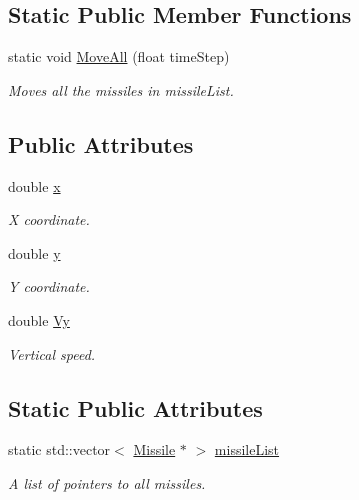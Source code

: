 \subsection*{Static Public Member Functions}
\begin{DoxyCompactItemize}
\item 
static void \hyperlink{class_missile_a7456f2bdca970cb8511c74696dd643b4}{Move\+All} (float time\+Step)
\begin{DoxyCompactList}\small\item\em Moves all the missiles in missile\+List. \end{DoxyCompactList}\end{DoxyCompactItemize}
\subsection*{Public Attributes}
\begin{DoxyCompactItemize}
\item 
\mbox{\label{class_missile_a763cf58f17fed394b8ea34e09e35dc10}} 
double \hyperlink{class_missile_a763cf58f17fed394b8ea34e09e35dc10}{x}
\begin{DoxyCompactList}\small\item\em X coordinate. \end{DoxyCompactList}\item 
\mbox{\label{class_missile_a375910ba165198e112b2dffae9e7e387}} 
double \hyperlink{class_missile_a375910ba165198e112b2dffae9e7e387}{y}
\begin{DoxyCompactList}\small\item\em Y coordinate. \end{DoxyCompactList}\item 
\mbox{\label{class_missile_a4814062269e86e6a6aaad58edc9cced7}} 
double \hyperlink{class_missile_a4814062269e86e6a6aaad58edc9cced7}{Vy}
\begin{DoxyCompactList}\small\item\em Vertical speed. \end{DoxyCompactList}\end{DoxyCompactItemize}
\subsection*{Static Public Attributes}
\begin{DoxyCompactItemize}
\item 
\mbox{\label{class_missile_a019a3af7bf785a49ba80d3add483b5b5}} 
static std\+::vector$<$ \hyperlink{class_missile}{Missile} $\ast$ $>$ \hyperlink{class_missile_a019a3af7bf785a49ba80d3add483b5b5}{missile\+List}
\begin{DoxyCompactList}\small\item\em A list of pointers to all missiles. \end{DoxyCompactList}\end{DoxyCompactItemize}


